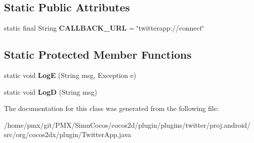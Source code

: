 \subsection*{Static Public Attributes}
\begin{DoxyCompactItemize}
\item 
\mbox{\label{classorg_1_1cocos2dx_1_1plugin_1_1TwitterApp_a6a8d2ce6510c06e676a3dff35d1ca197}} 
static final String {\bfseries C\+A\+L\+L\+B\+A\+C\+K\+\_\+\+U\+RL} = \char`\"{}twitterapp\+://connect\char`\"{}
\end{DoxyCompactItemize}
\subsection*{Static Protected Member Functions}
\begin{DoxyCompactItemize}
\item 
\mbox{\label{classorg_1_1cocos2dx_1_1plugin_1_1TwitterApp_a9dab89385f02d08ca8309d4897b3eba4}} 
static void {\bfseries LogE} (String msg, Exception e)
\item 
\mbox{\label{classorg_1_1cocos2dx_1_1plugin_1_1TwitterApp_a260bafc00985789c8ae1e4ffaca94901}} 
static void {\bfseries LogD} (String msg)
\end{DoxyCompactItemize}


The documentation for this class was generated from the following file\+:\begin{DoxyCompactItemize}
\item 
/home/pmx/git/\+P\+M\+X/\+Simu\+Cocos/cocos2d/plugin/plugins/twitter/proj.\+android/src/org/cocos2dx/plugin/Twitter\+App.\+java\end{DoxyCompactItemize}
